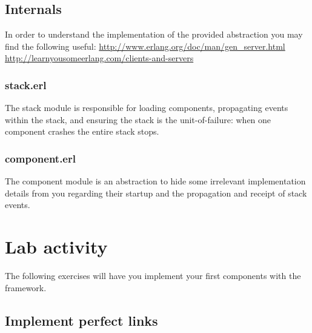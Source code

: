 \documentclass[a4paper]{article}
\begin{document}




\subsection{Internals} %
\label{sub:internals}

In order to understand the implementation of the provided abstraction you
may find the following useful:
\url{http://www.erlang.org/doc/man/gen_server.html}\\
\url{http://learnyousomeerlang.com/clients-and-servers}

\subsubsection{stack.erl} %
\label{sub:stack_erl}

The stack module is responsible for loading components, propagating events
within the stack, and ensuring the stack is the unit-of-failure: when one
component crashes the entire stack stops.


\subsubsection{component.erl} %
\label{sub:component_erl}

The component module is an abstraction to hide some irrelevant implementation
details from you regarding their startup and the propagation and receipt of
stack events.





\section{Lab activity} %
\label{sec:lab_activity}

The following exercises will have you implement your first components with the
framework.

\subsection{Implement perfect links} %
\label{sub:implement_pl}
\end{document}
